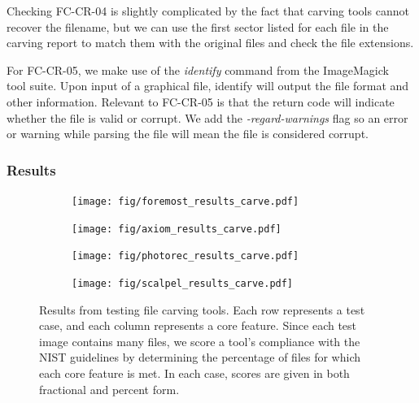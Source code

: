 Checking FC-CR-04 is slightly complicated by the fact that carving tools cannot recover the filename, but we can use the first sector listed for each file in the carving report to match them with the original files and check the file extensions.

For FC-CR-05, we make use of the \emph{identify} command from the ImageMagick~\cite{imagemagick} tool suite. Upon input of a graphical file, identify will output the file format and other information. Relevant to FC-CR-05 is that the return code will indicate whether the file is valid or corrupt. We add the \emph{-regard-warnings} flag so an error or warning while parsing the file will mean the file is considered corrupt.

\subsubsection{Results}

\begin{figure}
    \centering

    \begin{subfigure}{\linewidth}
        \texttt{[image: fig/foremost\_results\_carve.pdf]}
    \end{subfigure}
    \begin{subfigure}{\linewidth}
        \texttt{[image: fig/axiom\_results\_carve.pdf]}
    \end{subfigure}
    \begin{subfigure}{\linewidth}
        \texttt{[image: fig/photorec\_results\_carve.pdf]}
    \end{subfigure}
    \begin{subfigure}{\linewidth}
        \texttt{[image: fig/scalpel\_results\_carve.pdf]}
    \end{subfigure}
        
    \caption{
    Results from testing file carving tools. 
    Each row represents a test case, and each column represents a core feature. 
    Since each test image contains many files, we score a tool's compliance with the NIST guidelines by determining the percentage of files for which each core feature is met.
    In each case, scores are given in both fractional and percent form.
    }
    \label{fig:results_carve}
\end{figure}

